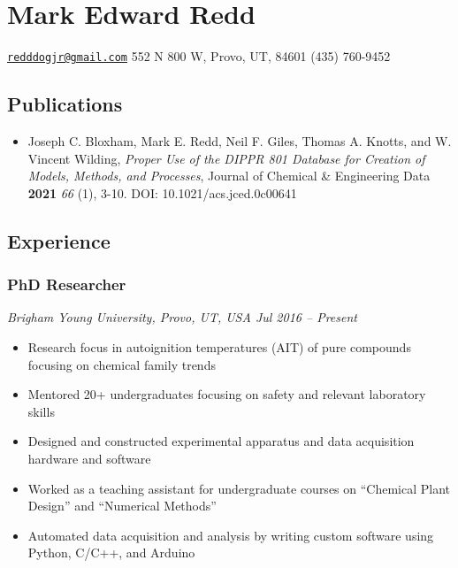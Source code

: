 
\hypertarget{mark-edward-redd}{%
\section{Mark Edward Redd}\label{mark-edward-redd}}

\href{mailto:redddogjr@gmail.com}{\nolinkurl{redddogjr@gmail.com}}
\textbar{} 552 N 800 W, Provo, UT, 84601 \textbar{} (435) 760-9452


\hypertarget{publications}{%
\subsection{Publications}\label{publications}}


\begin{itemize}
\tightlist
\item
  Joseph C. Bloxham, Mark E. Redd, Neil F. Giles, Thomas A. Knotts, and
  W. Vincent Wilding, \emph{Proper Use of the DIPPR 801 Database for
  Creation of Models, Methods, and Processes}, Journal of Chemical \&
  Engineering Data \textbf{2021} \emph{66} (1), 3-10. DOI:
  10.1021/acs.jced.0c00641
\end{itemize}

\hypertarget{experience}{%
\subsection{Experience}\label{experience}}

\hypertarget{phd-researcher}{%
\subsubsection{PhD Researcher}\label{phd-researcher}}

\emph{Brigham Young University, Provo, UT, USA \textbar{} Jul 2016 --
Present}

\begin{itemize}
\tightlist
\item
  Research focus in autoignition temperatures (AIT) of pure compounds
  focusing on chemical family trends
\item
  Mentored 20+ undergraduates focusing on safety and relevant laboratory
  skills
\item
  Designed and constructed experimental apparatus and data acquisition
  hardware and software
\item
  Worked as a teaching assistant for undergraduate courses on ``Chemical
  Plant Design'' and ``Numerical Methods''
\item
  Automated data acquisition and analysis by writing custom software
  using Python, C/C++, and Arduino
\end{itemize}

